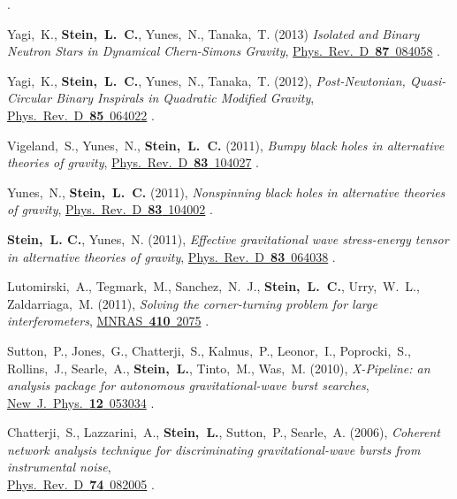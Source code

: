 \begin{etaremune}[start=\value{pubCounter}]
  .
\item
  Yagi,~K., {\bf Stein,~L.~C.}, Yunes,~N., Tanaka,~T.
  (2013)
  {\it Isolated and Binary Neutron Stars in Dynamical Chern-Simons Gravity},
  \href{http://dx.doi.org/10.1103/PhysRevD.87.084058}{Phys.~Rev.~D~{\bf 87}~084058}
  .
\item
  Yagi,~K., {\bf Stein,~L.~C.}, Yunes,~N., Tanaka,~T.
  (2012),
  {\it Post-Newtonian, Quasi-Circular Binary Inspirals in Quadratic Modified Gravity},
  \href{http://dx.doi.org/10.1103/PhysRevD.85.064022}{Phys.~Rev.~D~{\bf 85}~064022}
  .
\item
  Vigeland,~S., Yunes,~N., {\bf Stein,~L.~C.}
  (2011),
  {\it Bumpy black holes in alternative theories of gravity},
  \href{http://dx.doi.org/10.1103/PhysRevD.83.104027}{Phys.~Rev.~D~{\bf 83}~104027}
  .
\item
  Yunes,~N., {\bf Stein,~L.~C.}
  (2011),
  {\it Nonspinning black holes in alternative theories of gravity},
  \href{http://dx.doi.org/10.1103/PhysRevD.83.104002}{Phys.~Rev.~D~{\bf 83}~104002}
  .
\item
  {\bf Stein,~L. C.}, Yunes,~N.
  (2011),
  {\it Effective gravitational wave stress-energy tensor in
    alternative theories of gravity},
  \href{http://dx.doi.org/10.1103/PhysRevD.83.064038}{Phys.~Rev.~D~{\bf 83}~064038}
  .
\item
  Lutomirski,~A., Tegmark,~M., Sanchez,~N.~J., {\bf
    Stein,~L.~C.}, Urry,~W.~L., Zaldarriaga,~M.
  (2011),
  {\it Solving the corner-turning problem for large interferometers},
  \href{http://dx.doi.org/10.1111/j.1365-2966.2010.17587.x}{MNRAS~{\bf 410}~2075}
  .
\item
  Sutton,~P., Jones,~G., Chatterji,~S., Kalmus,~P., Leonor,~I.,
  Poprocki,~S., Rollins,~J., Searle,~A., {\bf Stein,~L.}, Tinto,~M.,
  Was,~M.
  (2010),
  {\it X-Pipeline: an analysis package for autonomous
    gravitational-wave burst searches},
  \href{http://dx.doi.org/10.1088/1367-2630/12/5/053034}{New~J.~Phys.~{\bf 12}~053034}
  .
\item
  Chatterji,~S., Lazzarini,~A., {\bf Stein,~L.}, Sutton,~P.,
  Searle,~A.
  (2006),
  {\it Coherent network analysis technique for
    discriminating gravitational-wave bursts from instrumental noise},\\
  \href{http://dx.doi.org/10.1103/PhysRevD.74.082005}{Phys.~Rev.~D~{\bf 74}~082005}
  .
  \setcounter{pubCounter}{\value{enumi}}
\end{etaremune}

